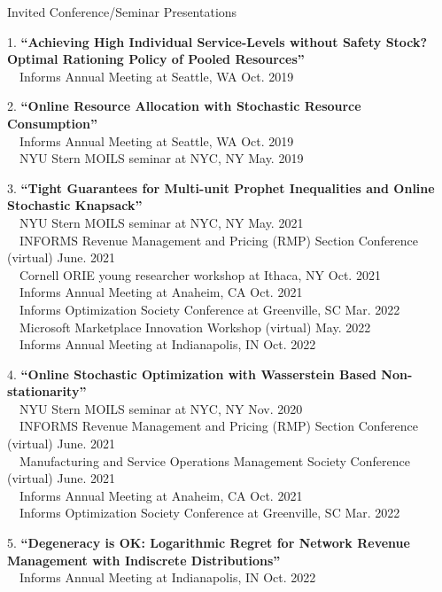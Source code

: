 \documentclass{resume} %
\begin{document}
\begin{rSection}{Invited Conference/Seminar Presentations}
\vspace{-0.3cm}
\item[1.] \textbf{``Achieving High Individual Service-Levels without Safety Stock? Optimal Rationing Policy of Pooled Resources''} \\
 \ \ Informs Annual Meeting at Seattle, WA  \hfill{Oct. 2019}\\
\vspace{0.1cm}

\item[2.] \textbf{``Online Resource Allocation with Stochastic Resource Consumption''} \\
 \ \ Informs Annual Meeting at Seattle, WA \hfill{Oct. 2019} \\
 \ \ NYU Stern MOILS seminar at NYC, NY \hfill{May. 2019}\\
 \vspace{0.1cm}

\item[3.] \textbf{``Tight Guarantees for Multi-unit Prophet Inequalities and Online Stochastic Knapsack''}\\
 \ \ NYU Stern MOILS seminar at NYC, NY \hfill{May. 2021}\\
 \ \ INFORMS Revenue Management and Pricing (RMP) Section Conference (virtual) \hfill{June. 2021}\\
 \ \ Cornell ORIE young researcher workshop at Ithaca, NY \hfill{Oct. 2021}\\
 \ \ Informs Annual Meeting at Anaheim, CA \hfill{Oct. 2021}\\
 \ \ Informs Optimization Society Conference at Greenville, SC \hfill{Mar. 2022}\\
 \ \ Microsoft Marketplace Innovation Workshop (virtual) \hfill{May. 2022}\\
 \ \ Informs Annual Meeting at Indianapolis, IN \hfill{Oct. 2022}\\
\vspace{0.1cm}

\item[4.] \textbf{``Online Stochastic Optimization with Wasserstein Based Non-stationarity''}\\
 \ \ NYU Stern MOILS seminar at NYC, NY \hfill{Nov. 2020}\\
 \ \ INFORMS Revenue Management and Pricing (RMP) Section Conference (virtual) \hfill{June. 2021}\\
 \ \ Manufacturing and Service Operations Management Society Conference (virtual) \hfill{June. 2021}\\
 \ \ Informs Annual Meeting at Anaheim, CA \hfill{Oct. 2021}\\
 \ \ Informs Optimization Society Conference at Greenville, SC \hfill{Mar. 2022}\\
\vspace{0.1cm}

\item[5.] \textbf{``Degeneracy is OK: Logarithmic Regret for Network Revenue Management with Indiscrete Distributions''}\\
 \ \ Informs Annual Meeting at Indianapolis, IN \hfill{Oct. 2022}\\
\end{rSection}
\end{document}
